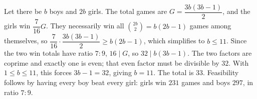 Let there be $b$ boys and $2b$ girls. The total games are $G=\dfrac{3b(3b-1)}{2}$, and the girls win $\dfrac{7}{16}G$. They necessarily win all $\binom{2b}{2}=b(2b-1)$ games among themselves, so $\dfrac{7}{16}\cdot\dfrac{3b(3b-1)}{2}\ge b(2b-1)$, which simplifies to $b\le11$. Since the two win totals have ratio $7:9$, $16\mid G$, so $32\mid b(3b-1)$. The two factors are coprime and exactly one is even; that even factor must be divisible by $32$. With $1\le b\le11$, this forces $3b-1=32$, giving $b=11$. The total is $\boxed{33}$. Feasibility follows by having every boy beat every girl: girls win $231$ games and boys $297$, in ratio $7:9$.

